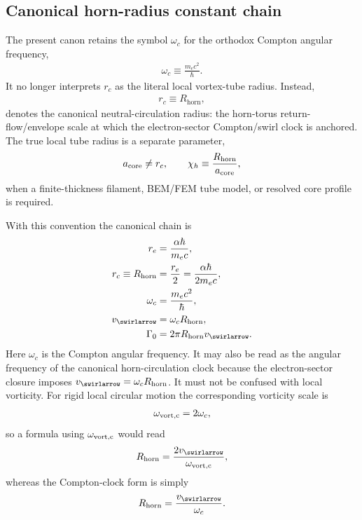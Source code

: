         \subsection{Canonical horn-radius constant chain}
            \label{subsec:canonical_horn_radius_chain}
            The present canon retains the symbol $\omega_c$ for the orthodox Compton angular frequency,
            \begin{align}
                \omega_c \equiv \frac{m_e c^2}{\hbar}.
            \end{align}
            It no longer interprets $r_c$ as the literal local vortex-tube radius. Instead,
            \begin{align}
                r_c \equiv R_{\mathrm{horn}},
            \end{align}
            denotes the canonical neutral-circulation radius: the horn-torus return-flow/envelope scale at which the electron-sector Compton/swirl clock is anchored. The true local tube radius is a separate parameter,
            \begin{align}
                a_{\rm core}\neq r_c,
                \qquad
                \chi_h \equiv \frac{R_{\mathrm{horn}}}{a_{\rm core}},
            \end{align}
            when a finite-thickness filament, BEM/FEM tube model, or resolved core profile is required.

            With this convention the canonical chain is
            \begin{align}
                r_e &= \frac{\alpha \hbar}{m_e c}, \\
                r_c \equiv R_{\mathrm{horn}} &= \frac{r_e}{2}
                    = \frac{\alpha\hbar}{2m_e c}, \\
                \omega_c &= \frac{m_e c^2}{\hbar}, \\
                v_{\swirlarrow} &= \omega_c R_{\mathrm{horn}}, \\
                \Gamma_0 &= 2\pi R_{\mathrm{horn}} v_{\swirlarrow}.
                \label{eq:canonical_horn_radius_chain}
            \end{align}
            Here $\omega_c$ is the Compton angular frequency. It may also be read as the angular frequency of the canonical horn-circulation clock because the electron-sector closure imposes $v_{\swirlarrow}=\omega_c R_{\mathrm{horn}}$. It must not be confused with local vorticity. For rigid local circular motion the corresponding vorticity scale is
            \begin{align}
                \omega_{\rm vort,c}=2\omega_c,
            \end{align}
            so a formula using $\omega_{\rm vort,c}$ would read
            \begin{align}
                R_{\mathrm{horn}}=\frac{2v_{\swirlarrow}}{\omega_{\rm vort,c}},
            \end{align}
            whereas the Compton-clock form is simply
            \begin{align}
                R_{\mathrm{horn}}=\frac{v_{\swirlarrow}}{\omega_c}.
            \end{align}


